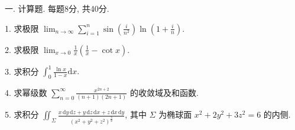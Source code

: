 \documentclass{examcollection}
\begin{document}
{\begin{minipage}{\textwidth}
\smallskip
一. 计算题. 每题8分, 共40分.\par
1. 求极限 $\lim_{n\to \infty}\sum_{i = 1}^{n}\sin \left(\frac{i}{n^2}\right)\ln \left(1 + \frac{i}{n}\right).$\par
2. 求极限 $\lim_{x\to 0}\frac{1}{x}\left(\frac{1}{x} -\cot x\right).$\par
3. 求积分 $\int_0^1\frac{\ln x}{1 - x}\mathrm{d}x.$\par
4. 求幂级数 $\sum_{n=0}^{\infty} \frac{x^{2n+2}}{(n+1)(2n+1)}$ 的收敛域及和函数.\par
5. 求积分 $\iint_{\Sigma} \frac{x \, \mathrm{d}y \, \mathrm{d}z + y \, \mathrm{d}z \, \mathrm{d}x + z \, \mathrm{d}x \, \mathrm{d}y}{(x^2 + y^2 + z^2)^{\frac{3}{2}}}$, 其中 $\Sigma$ 为椭球面 $x^2 + 2y^2 + 3z^2 = 6$ 的内侧.\par
\end{minipage}}
\ifdim\dimexpr\ht\proofbox+\dp\proofbox\relax>\textheight
\noindent\resizebox{!}{\textheight}{\usebox{\proofbox}}\else\noindent\usebox{\proofbox}\fi\clearpage
\end{document}
